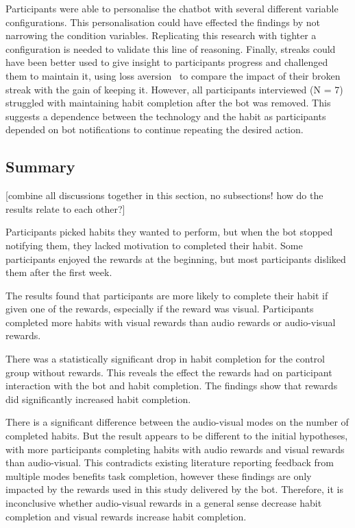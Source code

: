 \documentclass{scaffold/sigchi}
\begin{document}
Participants were able to personalise the chatbot with several different variable configurations. This personalisation could have effected the findings by not narrowing the condition variables. Replicating this research with tighter a configuration is needed to validate this line of reasoning. Finally, streaks could have been better used to give insight to participants progress and challenged them to maintain it, using loss aversion~\cite{loss_aversion} to compare the impact of their broken streak with the gain of keeping it. However, all participants interviewed (N = 7) struggled with maintaining habit completion after the bot was removed. This suggests a dependence between the technology and the habit as participants depended on bot notifications to continue repeating the desired action.

\subsection{Summary}
[combine all discussions together in this section, no subsections! how do the results relate to each other?]

Participants picked habits they wanted to perform, but when the bot stopped notifying them, they lacked motivation to completed their habit. Some participants enjoyed the rewards at the beginning, but most participants disliked them after the first week.

The results found that participants are more likely to complete their habit if given one of the rewards, especially if the reward was visual. Participants completed more habits with visual rewards than audio rewards or audio-visual rewards.

There was a statistically significant drop in habit completion for the control group without rewards. This reveals the effect the rewards had on participant interaction with the bot and habit completion. The findings show that rewards did significantly increased habit completion.

There is a significant difference between the audio-visual modes on the number of completed habits. But the result appears to be different to the initial hypotheses, with more participants completing habits with audio rewards and visual rewards than audio-visual. This contradicts existing literature reporting feedback from multiple modes benefits task completion, however these findings are only impacted by the rewards used in this study delivered by the bot. Therefore, it is inconclusive whether audio-visual rewards in a general sense decrease habit completion and visual rewards increase habit completion.
\end{document}

